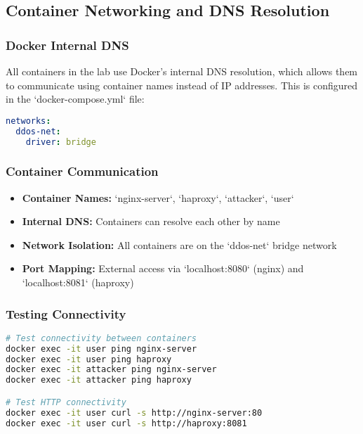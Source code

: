 \documentclass[12pt]{article}
\begin{document}
\subsection{Container Networking and DNS Resolution}

\subsubsection{Docker Internal DNS}
All containers in the lab use Docker's internal DNS resolution, which allows them to communicate using container names instead of IP addresses. This is configured in the `docker-compose.yml` file:

\begin{lstlisting}[language=yaml, caption=Network Configuration]
networks:
  ddos-net:
    driver: bridge
\end{lstlisting}

\subsubsection{Container Communication}
\begin{itemize}
    \item \textbf{Container Names:} `nginx-server`, `haproxy`, `attacker`, `user`
    \item \textbf{Internal DNS:} Containers can resolve each other by name
    \item \textbf{Network Isolation:} All containers are on the `ddos-net` bridge network
    \item \textbf{Port Mapping:} External access via `localhost:8080` (nginx) and `localhost:8081` (haproxy)
\end{itemize}

\subsubsection{Testing Connectivity}
\begin{lstlisting}[language=bash]
# Test connectivity between containers
docker exec -it user ping nginx-server
docker exec -it user ping haproxy
docker exec -it attacker ping nginx-server
docker exec -it attacker ping haproxy

# Test HTTP connectivity
docker exec -it user curl -s http://nginx-server:80
docker exec -it user curl -s http://haproxy:8081
\end{lstlisting}
\end{document}
